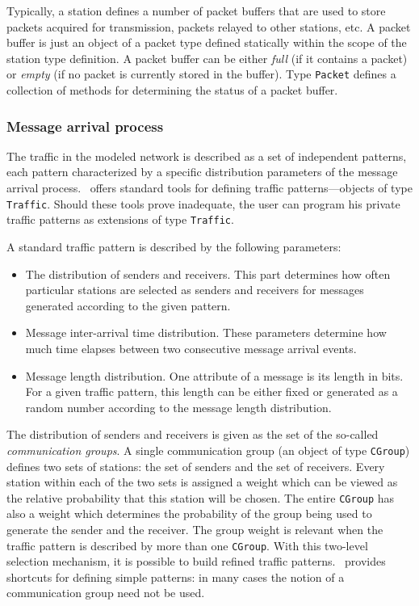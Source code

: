 Typically, a station defines a number of packet buffers that are used to
store packets acquired for transmission, packets relayed to other
stations, etc.
A packet buffer is just an object of a packet type defined statically
within the scope of the station type definition.
A packet buffer can be either {\em full\/} (if it contains a packet) or
{\em empty\/} (if no packet is currently stored in the buffer).
Type {\tt Packet} defines a collection of
methods for determining the status of a packet buffer.

\subsubsection{Message arrival process}

The traffic in the modeled network is described as a set of independent
patterns, each pattern characterized by a specific distribution parameters
of the message arrival process.
\smurph\ offers standard tools for defining traffic patterns---objects
of type {\tt Traffic}.
Should these tools prove inadequate, the user can program his private
traffic patterns as extensions of type {\tt Traffic}.

A standard traffic pattern is described by the following parameters:
\begin{itemize}
\item
The distribution of senders and receivers.
This part determines how often particular stations are selected as senders
and receivers for messages generated according to the given pattern.
\item
Message inter-arrival time distribution.
These parameters determine how much time elapses between two consecutive
message arrival events.
\item
Message length distribution.
One attribute of a message is its length in bits.
For a given traffic pattern, this length can be either fixed or generated as
a random number according to the message length distribution.
\end{itemize}

The distribution of senders and receivers is given as the set of the so-called
{\em communication groups}.
A single communication group (an object of type {\tt CGroup}) defines two
sets of stations: the set of senders and the set of receivers.
Every station within each of the two sets is assigned a weight which can be
viewed as the relative probability that this station will be chosen.
The entire {\tt CGroup} has also a weight which determines the probability of
the group being used to generate the sender and the receiver.
The group weight is relevant when the traffic pattern is described by
more than one {\tt CGroup}.
With this two-level selection mechanism, it is possible to build refined
traffic patterns.
\smurph\ provides shortcuts for defining simple patterns: in many cases the
notion of a communication group need not be used.

